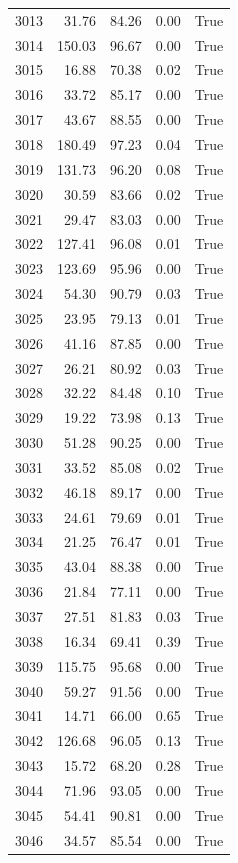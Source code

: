 \begin{longtable}{rrrrr}
3013 & 31.76 & 84.26 & 0.00 & True \\
3014 & 150.03 & 96.67 & 0.00 & True \\
3015 & 16.88 & 70.38 & 0.02 & True \\
3016 & 33.72 & 85.17 & 0.00 & True \\
3017 & 43.67 & 88.55 & 0.00 & True \\
3018 & 180.49 & 97.23 & 0.04 & True \\
3019 & 131.73 & 96.20 & 0.08 & True \\
3020 & 30.59 & 83.66 & 0.02 & True \\
3021 & 29.47 & 83.03 & 0.00 & True \\
3022 & 127.41 & 96.08 & 0.01 & True \\
3023 & 123.69 & 95.96 & 0.00 & True \\
3024 & 54.30 & 90.79 & 0.03 & True \\
3025 & 23.95 & 79.13 & 0.01 & True \\
3026 & 41.16 & 87.85 & 0.00 & True \\
3027 & 26.21 & 80.92 & 0.03 & True \\
3028 & 32.22 & 84.48 & 0.10 & True \\
3029 & 19.22 & 73.98 & 0.13 & True \\
3030 & 51.28 & 90.25 & 0.00 & True \\
3031 & 33.52 & 85.08 & 0.02 & True \\
3032 & 46.18 & 89.17 & 0.00 & True \\
3033 & 24.61 & 79.69 & 0.01 & True \\
3034 & 21.25 & 76.47 & 0.01 & True \\
3035 & 43.04 & 88.38 & 0.00 & True \\
3036 & 21.84 & 77.11 & 0.00 & True \\
3037 & 27.51 & 81.83 & 0.03 & True \\
3038 & 16.34 & 69.41 & 0.39 & True \\
3039 & 115.75 & 95.68 & 0.00 & True \\
3040 & 59.27 & 91.56 & 0.00 & True \\
3041 & 14.71 & 66.00 & 0.65 & True \\
3042 & 126.68 & 96.05 & 0.13 & True \\
3043 & 15.72 & 68.20 & 0.28 & True \\
3044 & 71.96 & 93.05 & 0.00 & True \\
3045 & 54.41 & 90.81 & 0.00 & True \\
3046 & 34.57 & 85.54 & 0.00 & True \\

\end{longtable}
